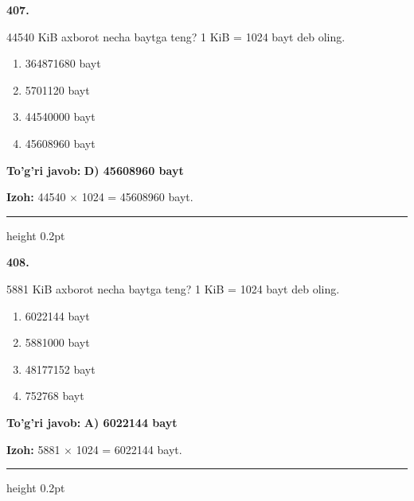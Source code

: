 \documentclass[10pt,a4paper,oneside]{article}
\begin{document}
\noindent\textbf{\color{ink}407.}
\par
44540 KiB axborot necha baytga teng? 1 KiB = 1024 bayt deb oling.
\begin{enumerate}[label=\Alph*),leftmargin=9mm]
\item 364871680 bayt
\item 5701120 bayt
\item 44540000 bayt
\item 45608960 bayt
\end{enumerate}
\begin{tcolorbox}[enhanced,breakable,colback=teal!4,colframe=teal!50!black,boxrule=0.5pt,arc=1.1mm,left=3mm,right=3mm,top=1.7mm,bottom=1.7mm,before skip=2mm,after skip=2mm]
\textbf{\color{teal}To'g'ri javob:} \textbf{D) 45608960 bayt}
\par\smallskip
\textbf{Izoh:} 44540 \ensuremath{\times} 1024 = 45608960 bayt.
\end{tcolorbox}
\vspace{2mm}\hrule height 0.2pt \vspace{3mm}

\noindent\textbf{\color{ink}408.}
\par
5881 KiB axborot necha baytga teng? 1 KiB = 1024 bayt deb oling.
\begin{enumerate}[label=\Alph*),leftmargin=9mm]
\item 6022144 bayt
\item 5881000 bayt
\item 48177152 bayt
\item 752768 bayt
\end{enumerate}
\begin{tcolorbox}[enhanced,breakable,colback=teal!4,colframe=teal!50!black,boxrule=0.5pt,arc=1.1mm,left=3mm,right=3mm,top=1.7mm,bottom=1.7mm,before skip=2mm,after skip=2mm]
\textbf{\color{teal}To'g'ri javob:} \textbf{A) 6022144 bayt}
\par\smallskip
\textbf{Izoh:} 5881 \ensuremath{\times} 1024 = 6022144 bayt.
\end{tcolorbox}
\vspace{2mm}\hrule height 0.2pt \vspace{3mm}
\end{document}

